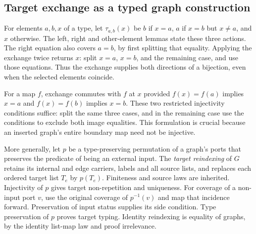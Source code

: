 \subsection{Target exchange as a typed graph construction}

For elements $a,b,x$ of a type, let $\tau_{a,b}(x)$ be $b$ if $x=a$,
$a$ if $x=b$ but $x\ne a$, and $x$ otherwise. The left, right and other-element
lemmas state these three actions. The right equation also covers $a=b$,
by first splitting that equality. Applying the exchange twice returns $x$:
split $x=a$, $x=b$, and the remaining case, and use those equations.
Thus the exchange supplies both directions of a bijection, even when the
selected elements coincide.







For a map $f$, exchange commutes with $f$ at $x$ provided
$f(x)=f(a)$ implies $x=a$ and $f(x)=f(b)$ implies $x=b$.
These two restricted injectivity conditions suffice: split the same three
cases, and in the remaining case use the conditions to exclude both image
equalities. This formulation is crucial because an inserted graph's entire
boundary map need not be injective.


More generally, let $p$ be a type-preserving permutation of a graph's ports
that preserves the predicate of being an external input. The \emph{target
reindexing} of $G$ retains its internal and edge carriers, labels and all
source lists, and replaces each ordered target list $T_e$ by $p(T_e)$.
Finiteness and source laws are inherited. Injectivity of $p$ gives target
non-repetition and uniqueness. For coverage of a non-input port $v$, use the
original coverage of $p^{-1}(v)$ and map that incidence forward. Preservation
of input status supplies its side condition. Type preservation of $p$ proves
target typing. Identity reindexing is equality of graphs, by the identity
list-map law and proof irrelevance.

